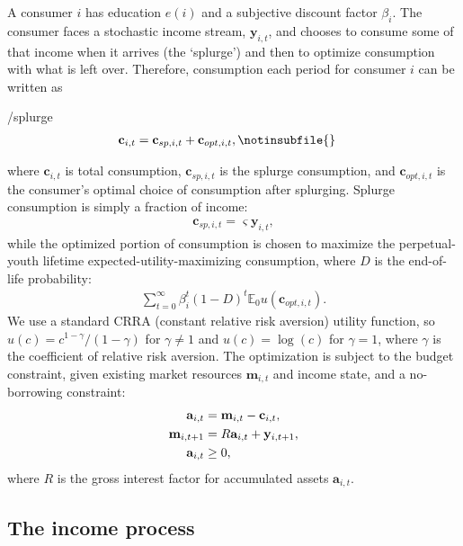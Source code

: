 \documentclass[\econtexRoot/HAFiscal]{subfiles}
\begin{document}
A consumer $i$ has education $e(i)$ and a subjective discount factor $\beta_i$. The consumer faces a stochastic income stream, $\mathbf{y}_{i,t}$, and chooses to consume some of that income when it arrives (the `splurge') and then to optimize consumption with what is left over. Therefore, consumption each period for consumer $i$ can be written as
\begin{verbatimwrite}{\EqDir/splurge}
\begin{align}
  \mathbf{c}_{i,t} &= \mathbf{c}_{sp,i,t} + \mathbf{c}_{opt,i,t}, \notinsubfile{\label{eq:model}}
\end{align}
\end{verbatimwrite}

where $\mathbf{c}_{i,t}$ is total consumption, $\mathbf{c}_{sp,i,t}$ is the splurge consumption, and $\mathbf{c}_{opt,i,t}$ is the consumer's optimal choice of consumption after splurging. Splurge consumption is simply a fraction of income:
\begin{align}
  \mathbf{c}_{sp,i,t} = \varsigma \mathbf{y}_{i,t},
\end{align}
while the optimized portion of consumption is chosen to maximize the perpetual-youth lifetime expected-utility-maximizing consumption, where $D$ is the end-of-life probability:
\begin{align}
  \sum_{t=0}^{\infty}\beta_i^t (1-D)^t \mathbb{E}_0 u(\mathbf{c}_{opt,i,t}).
\end{align}
We use a standard CRRA (constant relative risk aversion) utility function, so $u(c) = c^{1-\gamma}/(1-\gamma)$ for $\gamma \neq 1$ and $u(c) = \log(c)$ for $\gamma=1$, where $\gamma$ is the coefficient of relative risk aversion. The optimization is subject to the budget constraint, given existing market resources $\mathbf{m}_{i,t}$ and income state, and a no-borrowing constraint: 
\begin{align}
  \mathbf{a}_{i,t} &= \mathbf{m}_{i,t} - \mathbf{c}_{i,t}, \notag \\ 
  \mathbf{m}_{i,t+1} &= R \mathbf{a}_{i,t} + \mathbf{y}_{i,t+1}, \\
  \mathbf{a}_{i,t} &\geq 0,   \notag
\end{align}
where $R$ is the gross interest factor for accumulated assets $\mathbf{a}_{i,t}$.

\hypertarget{the-income-process}{}\par\subsection{The income process}
\end{document}
